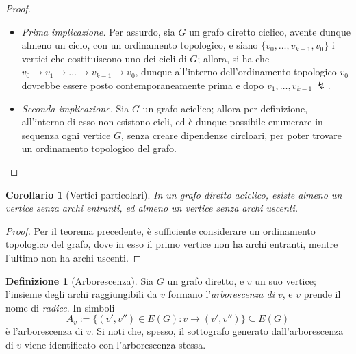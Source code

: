 \documentclass[14pt]{extreport}
\newtheorem{corollary}{Corollario}[subsection]
\theoremstyle{definition}
\newtheorem{definition}{Definizione}[subsection]
\theoremstyle{definition}
\begin{document}
\begin{proof}
    \hspace{0.7cm}
    \begin{itemize}
        \item[] \textit{Prima implicazione.} Per assurdo, sia $G$ un grafo diretto ciclico, avente dunque almeno un ciclo, con un ordinamento topologico, e siano $\{v_0, \ldots , v_{k - 1}, v_0\}$ i vertici che costituiscono uno dei cicli di $G$; allora, si ha che $v_0 \rightarrow v_1 \rightarrow \ldots \rightarrow v_{k - 1} \rightarrow v_0$, dunque all'interno dell'ordinamento topologico $v_0$ dovrebbe essere posto contemporaneamente prima e dopo $v_1, \ldots, v_{k - 1} \ \lightning$.
        \item[] \textit{Seconda implicazione.} Sia $G$ un grafo aciclico; allora per definizione, all'interno di esso non esistono cicli, ed è dunque possibile enumerare in sequenza ogni vertice $G$, senza creare dipendenze circloari, per poter trovare un ordinamento topologico del grafo.
    \end{itemize}
\end{proof}

\begin{corollary}[Vertici particolari]
    \label{vertici particolari}
    In un grafo diretto aciclico, esiste almeno un vertice senza archi entranti, ed almeno un vertice senza archi uscenti.
\end{corollary}

\begin{proof}
    Per il teorema precedente, è sufficiente considerare un ordinamento topologico del grafo, dove in esso il primo vertice non ha archi entranti, mentre l'ultimo non ha archi uscenti.
\end{proof}

\begin{definition}[Arborescenza]
    Sia $G$ un grafo diretto, e $v$ un suo vertice; l'insieme degli archi raggiungibili da $v$ formano l'\textit{arborescenza di $v$}, e $v$ prende il nome di \textit{radice}. In simboli $$A_v := \{(v', v'') \in E(G) : v \rightarrow (v', v'')\} \subseteq E(G)$$ è l'arborescenza di $v$. Si noti che, spesso, il sottografo generato dall'arborescenza di $v$ viene identificato con l'arborescenza stessa.
\end{definition}
\end{document}
